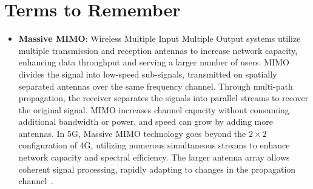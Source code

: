 \documentclass[english]{article}
\begin{document}
\clearpage
\appendix
\section{Terms to Remember}
\begin{itemize}
	\item \textbf{\hypertarget{MIMO}{Massive MIMO}}:
	      Wireless Multiple Input Multiple Output systems utilize multiple
	      transmission and reception antennas to increase network capacity,
	      enhancing data throughput and serving a larger number of users.
	      MIMO divides the signal into low-speed sub-signals, transmitted
	      on spatially separated antennas over the same frequency channel.
	      Through multi-path propagation, the receiver separates the signals
	      into parallel streams to recover the original signal. MIMO increases
	      channel capacity without consuming additional bandwidth or power,
	      and speed can grow by adding more antennas. In 5G, Massive MIMO
	      technology goes beyond the $2 \times 2$ configuration of 4G,
	      utilizing numerous simultaneous streams to enhance network
	      capacity and spectral efficiency. The larger antenna array
	      allows coherent signal processing, rapidly adapting to changes in
	      the propagation channel~\cite{Kathavate2021Critical}.


\end{itemize}
\end{document}
